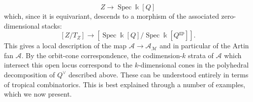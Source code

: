 \documentclass[11pt]{amsart}
\renewcommand{\to}{\rightarrow}
\newcommand{\kfield}{\Bbbk}
\newcommand{\Spec}{\operatorname{Spec}}
\newcommand{\Acal}{\mathcal{A}}
\newcommand{\Mcal}{\mathcal{M}}
\newcommand{\gp}{\operatorname{gp}}
\theoremstyle{definition}
\theoremstyle{definition}
\begin{document}
\begin{equation*} Z \to \Spec \kfield[Q] \end{equation*}
which, since it is equivariant, descends to a morphism of the associated zero-dimensional stacks:
\begin{equation*} \left[Z/T_Z \right] \to \left[ \Spec \kfield[Q] / \Spec\kfield [Q^{\gp}] \right]. \end{equation*}
This gives a local description of the map $\Acal \to \Acal_\Mcal$ and in particular of the Artin fan $\Acal$. By the orbit-cone correspondence, the codimension-$k$ strata of $\Acal$ which intersect this open locus correspond to the $k$-dimensional cones in the polyhedral decomposition of $Q^\vee$ described above. These can be understood entirely in terms of tropical combinatorics. This is best explained through a number of examples, which we now present.
\end{document}
